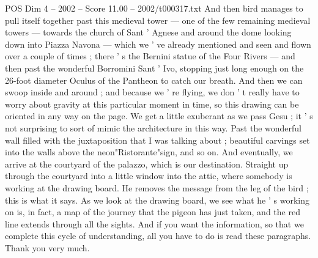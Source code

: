 \begin{textsample}{POS Dim 4 – 2002 – Score 11.00 – 2002/t000317.txt}
And then bird manages to pull itself together past this medieval tower — one of the few remaining medieval towers — towards the church of Sant ' Agnese and around the dome looking down into Piazza Navona — which we ' ve already mentioned and seen and flown over a couple of times ; there ' s the Bernini statue of the Four Rivers — and then past the wonderful Borromini Sant ' Ivo, stopping just long enough on the 26-foot diameter Oculus of the Pantheon to catch our breath.
And then we can swoop inside and around ; and because we ' re flying, we don ' t really have to worry about gravity at this particular moment in time, so this drawing can be oriented in any way on the page.
We get a little exuberant as we pass Gesu ; it ' s not surprising to sort of mimic the architecture in this way.
Past the wonderful wall filled with the juxtaposition that I was talking about ; beautiful carvings set into the walls above the neon"Ristorante"sign, and so on.
And eventually, we arrive at the courtyard of the palazzo, which is our destination.
Straight up through the courtyard into a little window into the attic, where somebody is working at the drawing board.
He removes the message from the leg of the bird ; this is what it says.
As we look at the drawing board, we see what he ' s working on is, in fact, a map of the journey that the pigeon has just taken, and the red line extends through all the sights.
And if you want the information, so that we complete this cycle of understanding, all you have to do is read these paragraphs.
Thank you very much.

\end{textsample}
